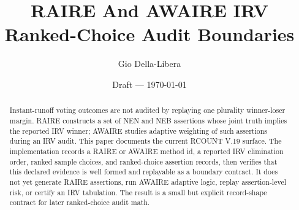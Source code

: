 \documentclass[12pt]{article}
\title{RAIRE And AWAIRE IRV Ranked-Choice Audit Boundaries}
\author{Gio Della-Libera}
\date{Draft --- \today}
\begin{document}
\maketitle

\begin{abstract}
Instant-runoff voting outcomes are not audited by replaying one plurality
winner-loser margin. RAIRE constructs a set of NEN and NEB assertions whose
joint truth implies the reported IRV winner; AWAIRE studies adaptive weighting
of such assertions during an IRV audit. This paper documents the current RCOUNT
V.19 surface. The implementation records a RAIRE or AWAIRE method id, a reported
IRV elimination order, ranked sample choices, and ranked-choice assertion
records, then verifies that this declared evidence is well formed and
replayable as a boundary contract. It does not yet generate RAIRE assertions,
run AWAIRE adaptive logic, replay assertion-level risk, or certify an IRV
tabulation. The result is a small but explicit record-shape contract for later
ranked-choice audit math.
\end{abstract}








\nocite{rcount-overview-2026,rcount-v19-2026}


\end{document}
